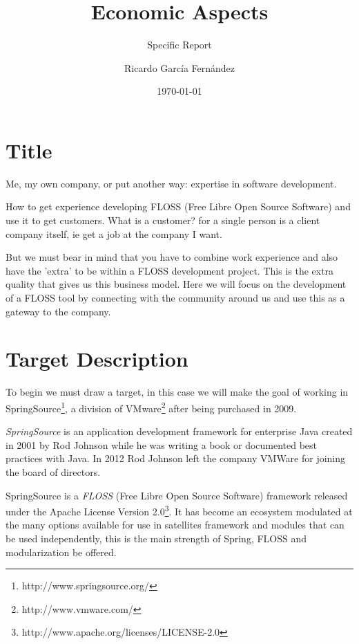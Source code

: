 \documentclass[11pt]{scrartcl}
\title{\textbf{Economic Aspects\\}}
\subtitle{Specific Report}
\author{Ricardo Garc\'ia Fern\'andez}
\date{\today}
\begin{document}
\maketitle

\tableofcontents

\newpage

\section{Title}

\par Me, my own company, or put another way: expertise in software development.

\par How to get experience developing FLOSS (Free Libre Open Source Software) and use it to get customers. What is a customer? for a single person is a client company itself, ie get a job at the company I want.

\par But we must bear in mind that you have to combine work experience and also have the 'extra' to be within a FLOSS development project. This is the extra quality that gives us this business model. Here we will focus on the development of a FLOSS tool by connecting with the community around us and use this as a gateway to the company.

\section{Target Description}

\par To begin we must draw a target, in this case we will make the goal of working in SpringSource\footnote{http://www.springsource.org/}, a division of VMware\footnote{http://www.vmware.com/} after being purchased in 2009.

\par \emph{SpringSource} is an application development framework for enterprise Java created in 2001 by Rod Johnson while he was writing a book or documented best practices with Java. In 2012 Rod Johnson left the company VMWare for joining the board of directors.

\par SpringSource is a \emph{FLOSS} (Free Libre Open Source Software) framework released under the Apache License Version 2.0\footnote{http://www.apache.org/licenses/LICENSE-2.0}. It has become an ecosystem modulated at the many options available for use in satellites framework and modules that can be used independently, this is the main strength of Spring, FLOSS and modularization be offered.
\end{document}
